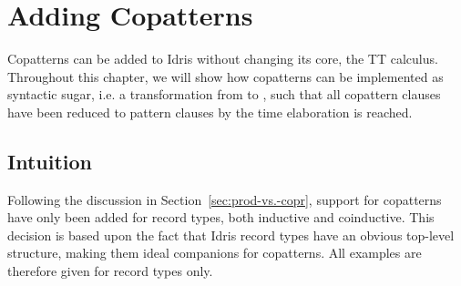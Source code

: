 \chapter{Adding Copatterns}
\label{sec:adding_copatterns}
Copatterns can be added to Idris without changing its core, the TT
calculus. Throughout this chapter, we will show how copatterns can be implemented as
syntactic sugar, i.e. a transformation from \IdrisM{} to \IdrisM{}, such that
all copattern clauses have been reduced to pattern clauses by the
time elaboration is reached.

\section{Intuition}
Following the discussion in Section~\ref{sec:prod-vs.-copr}, support for
copatterns have only been added for record types, both inductive and
coinductive. This decision is based upon the fact that Idris record types have
an obvious top-level structure, making them ideal companions for
copatterns. All examples are therefore given for record types only.

